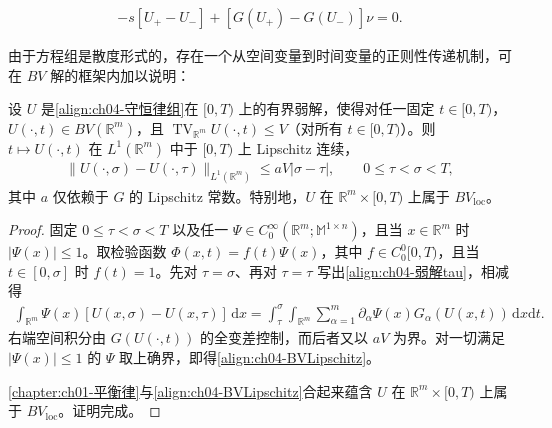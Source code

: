 \documentclass[../../main.tex]{subfiles}
\begin{document}
\begin{align}
-s[U_{+}-U_{-}]+[G(U_{+})-G(U_{-})]\nu=0.
\label{align:ch04-RH}
\end{align}

由于方程组是散度形式的，存在一个从空间变量到时间变量的正则性传递机制，可在 $BV$ 解的框架内加以说明：

\begin{theorem}\label{theorem:ch04-BV时间Lipschitz}
设 $U$ 是\eqref{align:ch04-守恒律组}在 $[0,T)$ 上的有界弱解，使得对任一固定 $t\in[0,T)$，$U(\cdot,t)\in BV(\mathbb{R}^{m})$，且 $\operatorname{TV}_{\mathbb{R}^{m}}U(\cdot,t)\leqslant V$（对所有 $t\in[0,T)$）。则 $t\mapsto U(\cdot,t)$ 在 $L^{1}(\mathbb{R}^{m})$ 中于 $[0,T)$ 上 Lipschitz 连续，
\begin{align}
\|U(\cdot,\sigma)-U(\cdot,\tau)\|_{L^{1}(\mathbb{R}^{m})}\leqslant aV|\sigma-\tau|,\qquad 0\leqslant\tau<\sigma<T,
\label{align:ch04-BVLipschitz}
\end{align}
其中 $a$ 仅依赖于 $G$ 的 Lipschitz 常数。特别地，$U$ 在 $\mathbb{R}^{m}\times[0,T)$ 上属于 $BV_{\mathrm{loc}}$。
\end{theorem}

\begin{proof}
固定 $0\leqslant\tau<\sigma<T$ 以及任一 $\Psi\in C_{0}^{\infty}(\mathbb{R}^{m};\mathbb{M}^{1\times n})$，且当 $x\in\mathbb{R}^{m}$ 时 $|\Psi(x)|\leqslant 1$。取检验函数 $\Phi(x,t)=f(t)\Psi(x)$，其中 $f\in C_{0}^{0}[0,T)$，且当 $t\in[0,\sigma]$ 时 $f(t)=1$。先对 $\tau=\sigma$、再对 $\tau=\tau$ 写出\eqref{align:ch04-弱解tau}，相减得
\begin{align}
\int_{\mathbb{R}^{m}}\Psi(x)[U(x,\sigma)-U(x,\tau)]\,\mathrm{d}x=\int_{\tau}^{\sigma}\int_{\mathbb{R}^{m}}\sum_{\alpha=1}^{m}\partial_{\alpha}\Psi(x)G_{\alpha}(U(x,t))\,\mathrm{d}x\mathrm{d}t.
\label{align:ch04-时间差}
\end{align}
右端空间积分由 $G(U(\cdot,t))$ 的全变差控制，而后者又以 $aV$ 为界。对一切满足 $|\Psi(x)|\leqslant 1$ 的 $\Psi$ 取上确界，即得\eqref{align:ch04-BVLipschitz}。

\cref{chapter:ch01-平衡律}与\eqref{align:ch04-BVLipschitz}合起来蕴含 $U$ 在 $\mathbb{R}^{m}\times[0,T)$ 上属于 $BV_{\mathrm{loc}}$。证明完成。

\end{proof}
\end{document}
